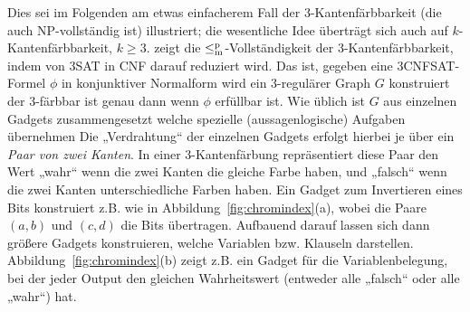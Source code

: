 Dies sei im Folgenden am etwas einfacherem Fall der 3-Kantenfärbbarkeit (die auch NP-vollständig ist) illustriert; die wesentliche Idee überträgt sich auch auf $k$-Kantenfärbbarkeit, $k\geq 3$.
\textcite{holyer_np-completeness_1981} zeigt die $\leq_\mathrm{m}^\mathrm{p}$-Vollständigkeit der 3-Kantenfärbbarkeit, indem von 3SAT in CNF darauf reduziert wird. Das ist, gegeben eine 3CNFSAT-Formel $\phi$ in konjunktiver Normalform wird ein 3-regulärer Graph $G$ konstruiert der 3-färbbar ist genau dann wenn $\phi$ erfüllbar ist. Wie üblich ist $G$ aus einzelnen Gadgets zusammengesetzt welche spezielle (aussagenlogische) Aufgaben übernehmen 
Die „Verdrahtung“ der einzelnen Gadgets erfolgt hierbei je über ein \emph{Paar von zwei Kanten}. In einer 3-Kantenfärbung repräsentiert diese Paar den Wert „wahr“ wenn die zwei Kanten die gleiche Farbe haben, und „falsch“ wenn die zwei Kanten unterschiedliche Farben haben.
Ein Gadget zum Invertieren eines Bits konstruiert \citeauthor{holyer_np-completeness_1981} z.B. wie in Abbildung~\ref{fig:chromindex}(a), wobei die Paare $(a,b)$ und $(c,d)$ die Bits übertragen.
Aufbauend darauf lassen sich dann größere Gadgets konstruieren, welche Variablen bzw. Klauseln darstellen. Abbildung~\ref{fig:chromindex}(b) zeigt z.B. ein Gadget für die Variablenbelegung, bei der jeder Output den gleichen Wahrheitswert (entweder alle „falsch“ oder alle „wahr“) hat.

